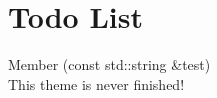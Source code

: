 \chapter{Todo List}
\hypertarget{todo}{}\label{todo}

\begin{DoxyRefList}
\item[Member \doxylink{classMyLibrary_1_1Example_a1c0046b0674eb4cad09c5d3e943912b8}{My\+Library\+::Example\+::test} (const std\+::string \&test)]\hfill \\
\label{todo__todo000001}%
%
This theme is never finished!
\end{DoxyRefList}